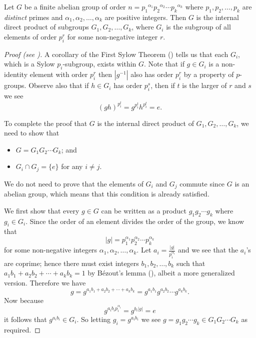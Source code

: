 \begin{lemma}\label{lemma-fundamental-theorem-of-finite-abelian-groups-1}
    Let $G$ be a finite abelian group of order $n = {p_1}^{\alpha_1}{p_2}^{\alpha_2}\cdots{p_k}^{\alpha_k}$ where $p_1, p_2, \dots, p_k$ are \textit{distinct} primes and $\alpha_1, \alpha_2, \dots, \alpha_k$ are positive integers. Then $G$ is the internal direct product of subgroups $G_1, G_2, \dots, G_k$, where $G_i$ is the subgroup of all elements of order $p_i^r$ for some non-negative integer $r$.
\end{lemma}
\begin{proof}[Proof (see {\cite[Lemma 13.8]{judson_beezer_2022}})]
    A corollary of the First Sylow Theorem () tells us that each $G_i$, which is a Sylow $p_i$-subgroup, exists within $G$. Note that if $g \in G_i$ is a non-identity element with order $p_i^r$ then $|g^{-1}|$ also has order $p_i^r$ by a property of $p$-groups. Observe also that if $h \in G_i$ has order $p_i^s$, then if $t$ is the larger of $r$ and $s$ we see
    \[
        (gh)^{p_i^t} = g^{p_i^t}h^{p_i^t} = e.
    \]

    To complete the proof that $G$ is the internal direct product of $G_1, G_2, \dots, G_k$, we need to show that
    \begin{itemize}
        \item $G = G_1G_2\cdots G_k$; and
        \item $G_i \cap G_j = \{e\}$ for any $i \neq j$.
    \end{itemize}
    We do not need to prove that the elements of $G_i$ and $G_j$ commute since $G$ is an abelian group, which means that this condition is already satisfied.

    We first show that every $g \in G$ can be written as a product $g_1g_2\cdots g_k$ where $g_i \in G_i$. Since the order of an element divides the order of the group, we know that
    \[
        |g| = p_1^{\alpha_1}p_2^{\alpha_2}\cdots p_k^{\alpha_k}
    \]
    for some non-negative integers $\alpha_1, \alpha_2, \dots, \alpha_k$. Let $a_i = \frac{|g|}{p_i^{\alpha_i}}$ and we see that the $a_i$'s are coprime; hence there must exist integers $b_1, b_2, \dots, b_k$ such that $a_1b_1 + a_2b_2 + \cdots + a_kb_k = 1$ by B\'ezout's lemma (), albeit a more generalized version. Therefore we have
    \[
        g = g^{a_1b_1 + a_2b_2 + \cdots + a_kb_k} = g^{a_1b_1}g^{a_2b_2}\cdots g^{a_kb_k}.
    \]
    Now because
    \[
        g^{a_ib_ip_i^{\alpha_i}} = g^{b_i|g|} = e
    \]
    it follows that $g^{a_ib_i} \in G_i$. So letting $g_i = g^{a_ib_i}$ we see $g = g_1g_2\cdots g_k \in G_1G_2\cdots G_k$ as required.


\end{proof}
